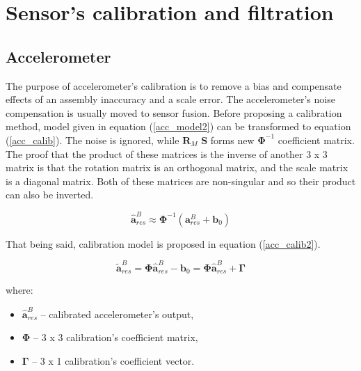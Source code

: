 \section{Sensor's calibration and filtration}



\subsection{Accelerometer}

The purpose of accelerometer's calibration is to remove a bias and compensate effects of an assembly inaccuracy and a scale error. The accelerometer's noise compensation is usually moved to sensor fusion. Before proposing a calibration method, model given in equation (\ref{acc_model2}) can be transformed to equation (\ref{acc_calib}). The noise is ignored, while $\bm{R}_M$ $\bm{S}$ forms new $\bm{\Phi}^{-1}$ coefficient matrix. The proof that the product of these matrices is the inverse of another 3 x 3 matrix is that the rotation matrix is an orthogonal matrix, and the scale matrix is a diagonal matrix. Both of these matrices are non-singular and so their product can also be inverted.

\begin{equation}
	\bm{\hat{a}}_{res}^B \approx \bm{\Phi}^{-1} \left( \bm{a}_{res}^B + \bm{b}_0 \right)
	\label{acc_calib}
\end{equation}

That being said, calibration model is proposed in equation (\ref{acc_calib2}).

\begin{equation}
	\bm{\tilde{a}}_{res}^B = \bm{\Phi} \bm{\hat{a}}_{res}^B - \bm{b}_0 = \bm{\Phi} \bm{\hat{a}}_{res}^B + \bm{\Gamma}
	\label{acc_calib2}
\end{equation}

where:
\begin{itemize}
	\item $\bm{\hat{a}}_{res}^B$ -- calibrated accelerometer's output,
	\item $\bm{\Phi}$ -- 3 x 3 calibration's coefficient matrix,
	\item $\bm{\Gamma}$ -- 3 x 1 calibration's coefficient vector.
\end{itemize}

